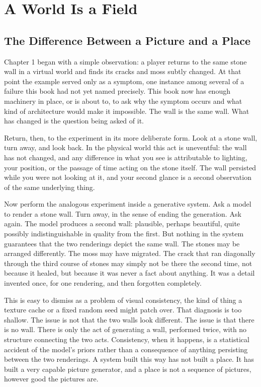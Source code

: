 \chapter{A World Is a Field}

\section{The Difference Between a Picture and a Place}

Chapter 1 began with a simple observation: a player returns to the same stone wall in a virtual world and finds its cracks and moss subtly changed. At that point the example served only as a symptom, one instance among several of a failure this book had not yet named precisely. This book now has enough machinery in place, or is about to, to ask why the symptom occurs and what kind of architecture would make it impossible. The wall is the same wall. What has changed is the question being asked of it.

Return, then, to the experiment in its more deliberate form. Look at a stone wall, turn away, and look back. In the physical world this act is uneventful: the wall has not changed, and any difference in what you see is attributable to lighting, your position, or the passage of time acting on the stone itself. The wall persisted while you were not looking at it, and your second glance is a second observation of the same underlying thing.

Now perform the analogous experiment inside a generative system. Ask a model to render a stone wall. Turn away, in the sense of ending the generation. Ask again. The model produces a second wall: plausible, perhaps beautiful, quite possibly indistinguishable in quality from the first. But nothing in the system guarantees that the two renderings depict the same wall. The stones may be arranged differently. The moss may have migrated. The crack that ran diagonally through the third course of stones may simply not be there the second time, not because it healed, but because it was never a fact about anything. It was a detail invented once, for one rendering, and then forgotten completely.

This is easy to dismiss as a problem of visual consistency, the kind of thing a texture cache or a fixed random seed might patch over. That diagnosis is too shallow. The issue is not that the two walls look different. The issue is that there is no wall. There is only the act of generating a wall, performed twice, with no structure connecting the two acts. Consistency, when it happens, is a statistical accident of the model's priors rather than a consequence of anything persisting between the two renderings. A system built this way has not built a place. It has built a very capable picture generator, and a place is not a sequence of pictures, however good the pictures are.

